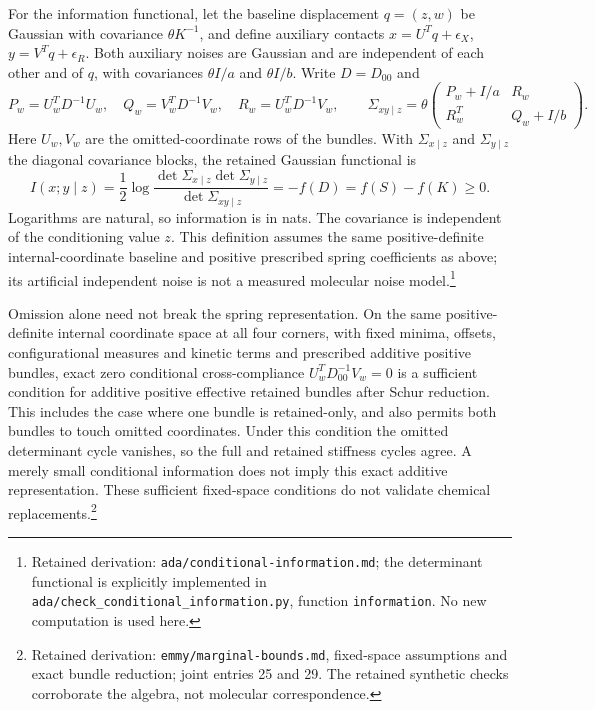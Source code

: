 \documentclass{article}
\begin{document}
For the information functional, let the baseline displacement \(q=(z,w)\) be Gaussian with covariance \(\theta K^{-1}\), and define auxiliary contacts \(x=U^Tq+\epsilon_X\), \(y=V^Tq+\epsilon_R\). Both auxiliary noises are Gaussian and are independent of each other and of \(q\), with covariances \(\theta I/a\) and \(\theta I/b\). Write \(D=D_{00}\) and
\[
 P_w=U_w^TD^{-1}U_w,\quad Q_w=V_w^TD^{-1}V_w,\quad R_w=U_w^TD^{-1}V_w,
 \qquad
 \Sigma_{xy\mid z}=\theta\begin{pmatrix}P_w+I/a&R_w\\R_w^T&Q_w+I/b\end{pmatrix}.
\]
Here \(U_w,V_w\) are the omitted-coordinate rows of the bundles. With \(\Sigma_{x\mid z}\) and \(\Sigma_{y\mid z}\) the diagonal covariance blocks, the retained Gaussian functional is
\[
 I(x;y\mid z)=\frac12\log\frac{\det\Sigma_{x\mid z}\det\Sigma_{y\mid z}}
 {\det\Sigma_{xy\mid z}}=-f(D)=f(S)-f(K)\ge0.
\]
Logarithms are natural, so information is in nats. The covariance is independent of the conditioning value \(z\). This definition assumes the same positive-definite internal-coordinate baseline and positive prescribed spring coefficients as above; its artificial independent noise is not a measured molecular noise model.\footnote{Retained derivation: \texttt{ada/conditional-information.md}; the determinant functional is explicitly implemented in \texttt{ada/check\_conditional\_information.py}, function \texttt{information}. No new computation is used here.}

Omission alone need not break the spring representation. On the same positive-definite internal coordinate space at all four corners, with fixed minima, offsets, configurational measures and kinetic terms and prescribed additive positive bundles, exact zero conditional cross-compliance \(U_w^TD_{00}^{-1}V_w=0\) is a sufficient condition for additive positive effective retained bundles after Schur reduction. This includes the case where one bundle is retained-only, and also permits both bundles to touch omitted coordinates. Under this condition the omitted determinant cycle vanishes, so the full and retained stiffness cycles agree. A merely small conditional information does not imply this exact additive representation. These sufficient fixed-space conditions do not validate chemical replacements.\footnote{Retained derivation: \texttt{emmy/marginal-bounds.md}, fixed-space assumptions and exact bundle reduction; joint entries 25 and 29. The retained synthetic checks corroborate the algebra, not molecular correspondence.}
\end{document}

